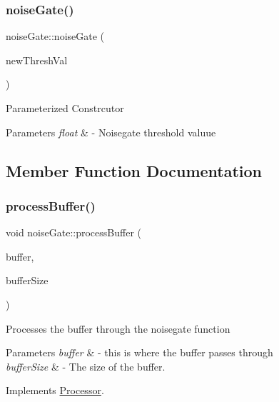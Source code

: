 \subsubsection{\texorpdfstring{noise\+Gate()}{noiseGate()}\hspace{0.1cm}{\footnotesize\ttfamily [2/2]}}
{\footnotesize\ttfamily noise\+Gate\+::noise\+Gate (\begin{DoxyParamCaption}\item[{float}]{new\+Thresh\+Val }\end{DoxyParamCaption})}

Parameterized Constrcutor 
\begin{DoxyParams}{Parameters}
{\em float} & -\/ Noisegate threshold valuue \\
\hline
\end{DoxyParams}


\subsection{Member Function Documentation}
\mbox{\label{classnoiseGate_a80aba98941fd95442fa3961b370fad35}} 
\subsubsection{\texorpdfstring{process\+Buffer()}{processBuffer()}}
{\footnotesize\ttfamily void noise\+Gate\+::process\+Buffer (\begin{DoxyParamCaption}\item[{unsigned char $\ast$}]{buffer,  }\item[{int}]{buffer\+Size }\end{DoxyParamCaption})\hspace{0.3cm}{\ttfamily [virtual]}}

Processes the buffer through the noisegate function 
\begin{DoxyParams}{Parameters}
{\em buffer} & -\/ this is where the buffer passes through \\
\hline
{\em buffer\+Size} & -\/ The size of the buffer. \\
\hline
\end{DoxyParams}


Implements \hyperlink{classProcessor_a401e57b59e43de9c4a51ca0f566d2948}{Processor}.

\mbox{\label{classnoiseGate_a2d58154fafa037e4c9512284e0431eed}} 
